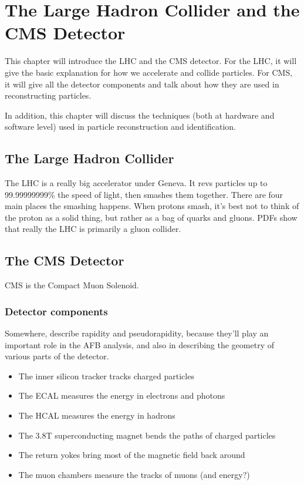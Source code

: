 \chapter{The Large Hadron Collider and the CMS Detector}
\label{chap:hardware}

This chapter will introduce the LHC and the CMS detector.
For the LHC, it will give the basic explanation for how we accelerate
and collide particles. For CMS, it will give all the detector components
and talk about how they are used in reconstructing particles.

In addition, this chapter will discuss the techniques (both at hardware
and software level) used in particle reconstruction and identification.

\section{The Large Hadron Collider}
\label{sec:lhc}

The LHC is a really big accelerator under Geneva. It revs particles up
to 99.99999999\% the speed of light, then smashes them together.
There are four main places the smashing happens.
When protons smash, it's best not to think of the proton as a solid
thing, but rather as a bag of quarks and gluons. PDFs show that really
the LHC is primarily a gluon collider.

\section{The CMS Detector}
\label{sec:cms}

CMS is the Compact Muon Solenoid.

\subsection{Detector components}
\label{ssec:cmsparts}

Somewhere, describe rapidity and pseudorapidity, because they'll
play an important role in the AFB analysis, and also in describing the
geometry of various parts of the detector.

\begin{itemize}
\item The inner silicon tracker tracks charged particles
\item The ECAL measures the energy in electrons and photons
\item The HCAL measures the energy in hadrons
\item The 3.8T superconducting magnet bends the paths of charged particles
\item The return yokes bring most of the magnetic field back around
\item The muon chambers measure the tracks of muons (and energy?)
\end{itemize}

